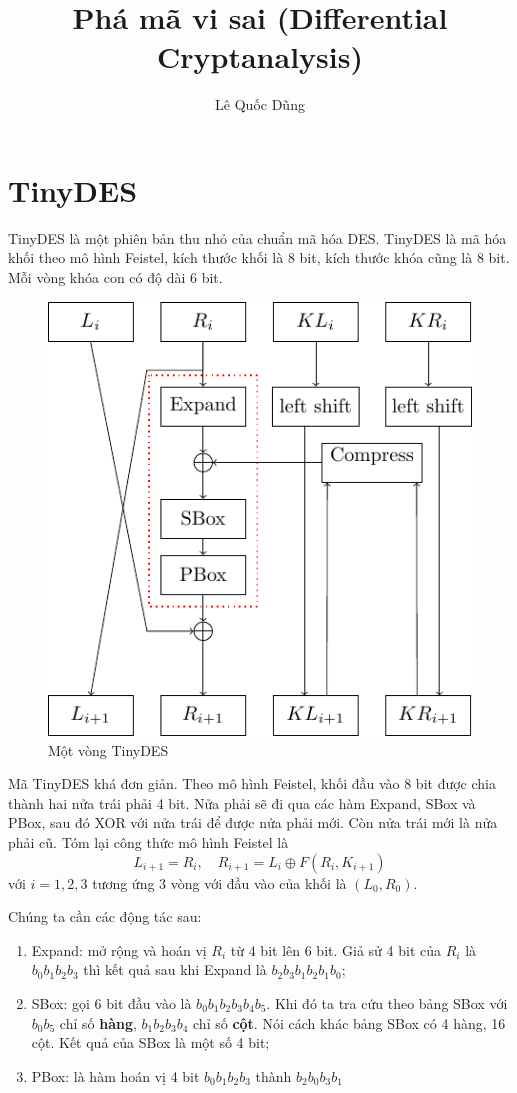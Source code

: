 \documentclass{article}
\title{Phá mã vi sai (Differential Cryptanalysis)}
\author{Lê Quốc Dũng}
\begin{document}
\maketitle

\section{TinyDES}

TinyDES là một phiên bản thu nhỏ của chuẩn mã hóa DES. TinyDES
là mã hóa khối theo mô hình Feistel, kích thước khối là 8 bit, kích
thước khóa cũng là 8 bit. Mỗi vòng khóa con có độ dài 6 bit.

\begin{figure}[ht]
    \centering
    \includegraphics{../../pics/tinydes/blocky.pdf}
    \caption{Một vòng TinyDES}
\end{figure}

Mã TinyDES khá đơn giản. Theo mô hình Feistel, khối đầu vào 8 bit được chia thành
hai nửa trái phải 4 bit. Nửa phải sẽ đi qua các hàm Expand, SBox và PBox, sau đó
XOR với nửa trái để được nửa phải mới. Còn nửa trái mới là nửa phải cũ. Tóm lại 
công thức mô hình Feistel là
\[L_{i+1} = R_i, \quad R_{i+1} = L_i \oplus F(R_i, K_{i+1})\]
với $i = 1, 2, 3$ tương ứng 3 vòng với đầu vào của khối là $(L_0, R_0)$.

Chúng ta cần các động tác sau:

\begin{enumerate}
    \item Expand: mở rộng và hoán vị $R_i$ từ 4 bit lên 6 bit. Giả sử 4 bit
    của $R_i$ là $b_0 b_1 b_2 b_3$ thì kết quả sau khi Expand là $b_2 b_3 b_1
    b_2 b_1 b_0$;
    \item SBox: gọi 6 bit đầu vào là $b_0 b_1 b_2 b_3 b_4 b_5$. Khi đó ta tra
    cứu theo bảng SBox với $b_0 b_5$ chỉ số \textbf{hàng}, $b_1 b_2 b_3 b_4$ chỉ
    số \textbf{cột}. Nói cách khác bảng SBox có 4 hàng, 16 cột. Kết quả của SBox
    là một số 4 bit;
    \item PBox: là hàm hoán vị 4 bit $b_0 b_1 b_2 b_3$ thành $b_2 b_0 b_3 b_1$
\end{enumerate}
\end{document}
